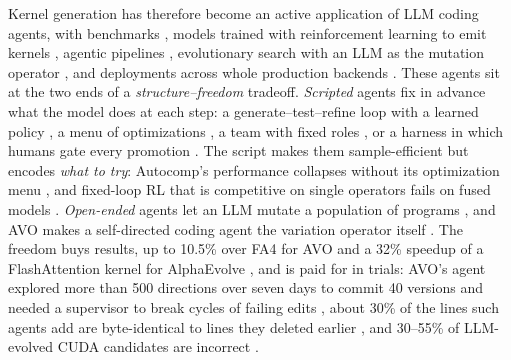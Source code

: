 Kernel generation has therefore become an active application of LLM coding agents, with benchmarks
\cite{ouyang2025kernelbench,xing2026flashinferbench,lin2026solexecbench,oliaro2026fastkernels},
models trained with reinforcement learning to emit kernels
\cite{baronio2025kevin,li2025cudal1,cudaagent2026,drkernel2026}, agentic pipelines
\cite{hong2025autocomp,wei2025astra,kernelskill2026}, evolutionary search with an LLM as the mutation
operator \cite{novikov2025alphaevolve,lange2025shinkaevolve,chen2026avo}, and deployments across
whole production backends \cite{liao2025kernelevolve,cursor2026multiagent}. These agents sit at the
two ends of a \emph{structure--freedom} tradeoff. \emph{Scripted} agents fix in advance what the
model does at each step: a generate--test--refine loop with a learned policy
\cite{baronio2025kevin,li2025cudal1,drkernel2026}, a menu of optimizations \cite{hong2025autocomp},
a team with fixed roles \cite{wei2025astra,kernelskill2026}, or a harness in which humans gate every
promotion \cite{shui2026harness}. The script makes them sample-efficient but encodes \emph{what to
try}: Autocomp's performance collapses without its optimization menu \cite{hong2025autocomp}, and
fixed-loop RL that is competitive on single operators fails on fused models
\cite{drkernel2026,zhu2026qimengkernel,cudaagent2026}. \emph{Open-ended} agents let an LLM mutate a
population of programs
\cite{romeraparedes2024funsearch,novikov2025alphaevolve,lange2025shinkaevolve,guo2025evoengineer,wiedemann2026kernelfoundry},
and AVO makes a self-directed coding agent the variation operator itself \cite{chen2026avo}. The
freedom buys results, up to 10.5\% over FA4 for AVO \cite{chen2026avo} and a 32\% speedup of a
FlashAttention kernel for AlphaEvolve \cite{novikov2025alphaevolve}, and is paid for in trials: AVO's
agent explored more than 500 directions over seven days to commit 40 versions and needed a
supervisor to break cycles of failing edits \cite{chen2026avo}, about 30\% of the lines such agents
add are byte-identical to lines they deleted earlier \cite{pelleriti2026evotrace}, and 30--55\% of
LLM-evolved CUDA candidates are incorrect \cite{guo2025evoengineer,cuco2026}.


